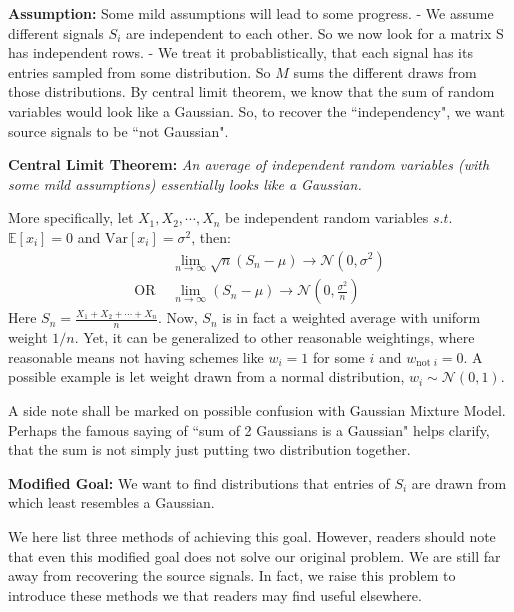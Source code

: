 \textbf{Assumption: } \newline Some mild assumptions will lead to some progress. \newline 
- We assume different signals $S_i$ are independent to each other. So we now look for a matrix S has independent rows. \newline
- We treat it probablistically, that each signal has its entries sampled from some distribution. So $M$ sums the different draws from those distributions. By central limit theorem, we know that the sum of random variables would look like a Gaussian. So, to recover the ``independency", we want source signals to be ``not Gaussian".

\textbf{Central Limit Theorem:}\textsl{ An average of independent random variables (with some mild assumptions) essentially looks like a Gaussian.}

More specifically, let $X_1, X_2, \cdots , X_n$ be independent random variables $s.t.$ $\mathbb{E}[x_i]=0$ and $\text{Var}[x_i] = \sigma ^2 $, then:
\begin{align*}
    & \lim_{n \to \infty} \sqrt{n}(S_n - \mu)  \to \mathcal{N}(0,\sigma ^2) \\
    \text{OR } & \lim_{n \to \infty} (S_n - \mu)  \to \mathcal{N}(0,\frac{\sigma ^2}{n})
\end{align*}
Here $S_n = \displaystyle \frac{X_1+ X_2 + \cdots + X_n}{n}$. Now, $S_n$ is in fact a weighted average with uniform weight $1/n$. Yet, it can be generalized to other reasonable weightings, where reasonable means not having schemes like $w_i = 1$ for some $i$ and $w_{\text{not }i} = 0$. A possible example is let weight drawn from a normal distribution, $w_i \sim \mathcal{N}(0,1)$.

A side note shall be marked on possible confusion with Gaussian Mixture Model. Perhaps the famous saying of ``sum of 2 Gaussians is a Gaussian" helps clarify, that the sum is not simply just putting two distribution together.

\textbf{Modified Goal: } \newline
We want to find distributions that entries of $S_i$ are drawn from which least resembles a Gaussian. 

We here list three methods of achieving this goal. However, readers should note that even this modified goal does not solve our original problem. We are still far away from recovering the source signals. In fact, we raise this problem to introduce these methods we that readers may find useful elsewhere.


